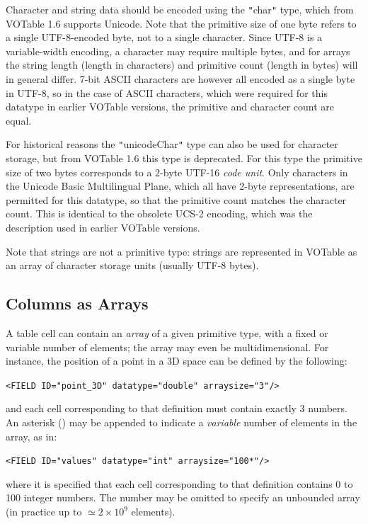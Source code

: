 \documentclass[11pt,a4paper]{ivoa}
\let\fg=\color
\def\slash {{\fg{blue}/}}
\def\attrval#1#2{{\tt{\fg{DarkRed}#1}="{\fg{DarkPurple}#2}"}}
\def\elemdef#1#2{{\tt\fg{blue}<}{\tt{\fg{DarkRed}#1}#2}{\tt\fg{blue}>}}
\def\literalvalue#1{{\tt"}{{\fg{DarkPurple}#1}}{\tt"}}
\begin{document}
Character and string data should be encoded using the \literalvalue{char}
type, which from VOTable 1.6 supports Unicode.
Note that the primitive size of one byte refers to a single
UTF-8-encoded byte, not to a single character.
Since UTF-8 is a variable-width encoding,
a character may require multiple bytes, and for arrays the
string length (length in characters) and primitive count (length in bytes)
will in general differ.
7-bit ASCII characters are however all encoded as a single byte in UTF-8,
so in the case of ASCII characters, which were required for this
datatype in earlier VOTable versions, the primitive and character count
are equal.

For historical reasons the \literalvalue{unicodeChar} type can also be used
for character storage, but from VOTable 1.6 this type is deprecated.
For this type the primitive size of two bytes corresponds to a 2-byte
UTF-16 {\em code unit}.
Only characters in the Unicode Basic Multilingual Plane,
which all have 2-byte representations, are permitted for this datatype,
so that the primitive count matches the character count.
This is identical to the obsolete UCS-2 encoding,
which was the description used in earlier VOTable versions.

Note that strings are not a primitive type: strings are
represented in VOTable as an array of character storage units
(usually UTF-8 bytes).


\subsection{Columns as Arrays}\label{array}
\label{sec:dim}

A table cell can contain an {\em array} of a given primitive type,
with a fixed or variable number of elements; the array may even
be multidimensional. For instance, the position of a point in a
3D space can be defined by the following:

\elemdef{FIELD}{ \attrval{ID}{point\_3D} \attrval{datatype}{double}
   \attrval{arraysize}{3}\slash}

\noindent and each cell corresponding to that definition must contain exactly
3 numbers. An asterisk ({\bf\tt*}) may be appended to indicate
a {\em variable} number of elements in the array, as in:

\elemdef{FIELD}{ \attrval{ID}{values} \attrval{datatype}{int}
   \attrval{arraysize}{100*}\slash}

\noindent where it is specified that each cell corresponding to that
  definition contains 0 to 100 integer numbers. The number may be
  omitted to specify an unbounded array
  (in practice up to $\simeq 2\times10^9$ elements).
\end{document}
